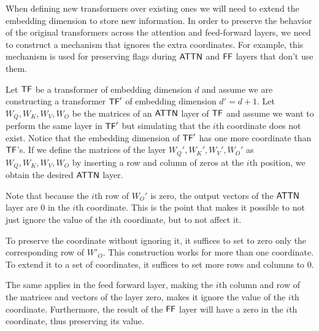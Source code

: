When defining new transformers over existing ones we will need to extend the embedding dimension to store new information.
In order to preserve the behavior of the original transformers across the attention and feed-forward layers, we need to construct a mechanism that ignores the extra coordinates.
For example, this mechanism is used for preserving flags during $\mathsf{ATTN}$ and $\mathsf{FF}$ layers that don't use them.

Let $\mathsf{TF}$ be a transformer of embedding dimension $d$ and assume we are constructing a transformer $\mathsf{TF}'$ of embedding dimension $d' = d + 1$.
Let $W_Q, W_K, W_V, W_O$ be the matrices of an $\mathsf{ATTN}$ layer of $\mathsf{TF}$ and assume we want to perform the same layer in $\mathsf{TF}'$ but simulating that the $i$th coordinate does not exist.
Notice that the embedding dimension of $\mathsf{TF}'$ has one more coordinate than $\mathsf{TF}$'s.
If we define the matrices of the layer $W_Q', W_K', W_V', W_O'$ as $W_Q, W_K, W_V, W_O$ by inserting a row and column of zeros at the $i$th position, we obtain the desired $\mathsf{ATTN}$ layer.


Note that because the $i$th row of $W_O'$ is zero, the output vectors of the $\mathsf{ATTN}$ layer are $0$ in the $i$th coordinate. 
This is the point that makes it possible to not just ignore the value of the $i$th coordinate, but to not affect it.


To preserve the coordinate without ignoring it, it suffices to set to zero only the corresponding row of $W'_O$.
This construction works for more than one coordinate.
To extend it to a set of coordinates, it suffices to set more rows and columns to $0$.


\medskip

The same applies in the feed forward layer, making the $i$th column and row of the matrices and vectors of the layer zero, makes it ignore the value of the $i$th coordinate. 
Furthermore, the result of the $\mathsf{FF}$ layer will have a zero in the $i$th coordinate, thus preserving its value.


